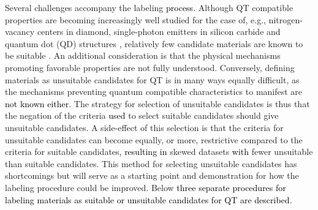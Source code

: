 \documentclass[superscriptaddress,unsortedaddress,
 amsmath,amssymb,
 aps,
]{revtex4-2}
\newcommand{\mrk}[1]{\textcolor{black}{#1}}
\begin{document}
Several challenges accompany the labeling \mrk{process.} 
Although QT compatible properties are becoming increasingly well studied for the case of, e.g., nitrogen-vacancy centers in diamond, single-photon emitters in silicon carbide and quantum dot (QD) structures \cite{Doherty_2013,Bathen2021,Aharonovich_2016}, relatively few candidate materials are known to be suitable  \cite{Atatuere2018,Zhang2020}. An additional consideration is that the physical mechanisms promoting favorable properties are not fully understood. 
Conversely, defining materials as unsuitable candidates for QT is in many ways equally difficult, as the mechanisms preventing quantum compatible characteristics to manifest are \mrk{not known either}.  
The strategy for selection of unsuitable candidates is thus that the negation of the criteria \mrk{used} to select suitable candidates should give unsuitable candidates.
A side-effect of this selection is that the criteria for unsuitable candidates can become equally, or more, restrictive compared to the criteria for suitable candidates\mrk{, resulting in} skewed datasets \mrk{with} fewer unsuitable than suitable candidates. 
This method for selecting unsuitable candidates has shortcomings but will serve as a starting point and demonstration for how the labeling procedure could be improved. 
Below \mrk{three separate procedures for labeling materials as suitable or unsuitable candidates for QT are described}. 
\end{document}
